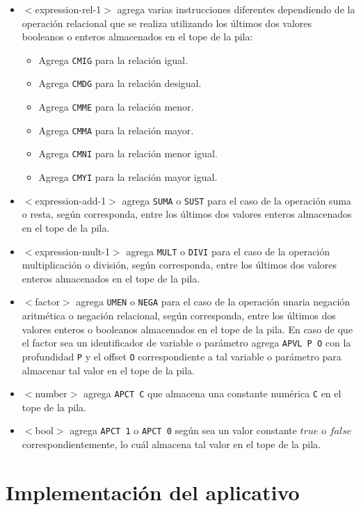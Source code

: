 \begin{itemize}
\item $<$expression-rel-1$>$ agrega varias instrucciones diferentes dependiendo de la operación relacional que se realiza utilizando los últimos dos valores booleanos o enteros almacenados en el tope de la pila:
\begin{itemize}
	\item Agrega \texttt{CMIG} para la relación igual.
	\item Agrega \texttt{CMDG} para la relación desigual.
	\item Agrega \texttt{CMME} para la relación menor.
	\item Agrega \texttt{CMMA} para la relación mayor.
	\item Agrega \texttt{CMNI} para la relación menor igual.
	\item Agrega \texttt{CMYI} para la relación mayor igual.
\end{itemize}
\item $<$expression-add-1$>$ agrega \texttt{SUMA} o \texttt{SUST} para el caso de la operación suma o resta, según corresponda, entre los últimos dos valores enteros almacenados en el tope de la pila.
\item $<$expression-mult-1$>$ agrega \texttt{MULT} o \texttt{DIVI} para el caso de la operación multiplicación o división, según corresponda, entre los últimos dos valores enteros almacenados en el tope de la pila.
\item $<$factor$>$ agrega \texttt{UMEN} o \texttt{NEGA} para el caso de la operación unaria negación aritmética o negación relacional, según corresponda, entre los últimos dos valores enteros o booleanos almacenados en el tope de la pila. En caso de que el factor sea un identificador de variable o parámetro agrega \texttt{APVL P O} con la profundidad \texttt{P} y el offset \texttt{O} correspondiente a tal variable o parámetro para almacenar tal valor en el tope de la pila.
\item $<$number$>$ agrega \texttt{APCT C} que almacena una constante numérica \texttt{C} en el tope de la pila.
\item $<$bool$>$ agrega \texttt{APCT 1} o \texttt{APCT 0} según sea un valor constante $true$ o $false$ correspondientemente, lo cuál almacena tal valor en el tope de la pila.
\end{itemize}

\section{Implementación del aplicativo}

